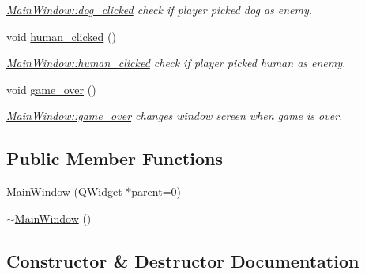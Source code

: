 \begin{DoxyCompactItemize}
\begin{DoxyCompactList}\small\item\em \hyperlink{class_main_window_a6fda2b6088de157a1e17c549dfa2b535}{Main\+Window\+::dog\+\_\+clicked} check if player picked dog as enemy. \end{DoxyCompactList}\item 
\hypertarget{class_main_window_ac77fd9a7046d941d9911f8ef276acc92}{}void \hyperlink{class_main_window_ac77fd9a7046d941d9911f8ef276acc92}{human\+\_\+clicked} ()\label{class_main_window_ac77fd9a7046d941d9911f8ef276acc92}

\begin{DoxyCompactList}\small\item\em \hyperlink{class_main_window_ac77fd9a7046d941d9911f8ef276acc92}{Main\+Window\+::human\+\_\+clicked} check if player picked human as enemy. \end{DoxyCompactList}\item 
\hypertarget{class_main_window_ad095804e948ea80ebaa1311858700ded}{}void \hyperlink{class_main_window_ad095804e948ea80ebaa1311858700ded}{game\+\_\+over} ()\label{class_main_window_ad095804e948ea80ebaa1311858700ded}

\begin{DoxyCompactList}\small\item\em \hyperlink{class_main_window_ad095804e948ea80ebaa1311858700ded}{Main\+Window\+::game\+\_\+over} changes window screen when game is over. \end{DoxyCompactList}\end{DoxyCompactItemize}
\subsection*{Public Member Functions}
\begin{DoxyCompactItemize}
\item 
\hyperlink{class_main_window_a8b244be8b7b7db1b08de2a2acb9409db}{Main\+Window} (Q\+Widget $\ast$parent=0)
\item 
\hyperlink{class_main_window_ae98d00a93bc118200eeef9f9bba1dba7}{$\sim$\+Main\+Window} ()
\end{DoxyCompactItemize}


\subsection{Constructor \& Destructor Documentation}
\hypertarget{class_main_window_a8b244be8b7b7db1b08de2a2acb9409db}{}
